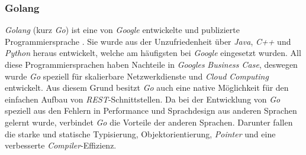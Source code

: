 		\subsubsection{Golang}
		\label{chapter:golanganalyse}
		\textit{Golang} (kurz \textit{Go}) ist eine von \textit{Google} entwickelte und publizierte Programmiersprache \cite{goDocs}. Sie wurde aus der Unzufriedenheit über \textit{Java}, \textit{C++} und \textit{Python} heraus entwickelt, welche am häufigsten bei \textit{Google} eingesetzt wurden. All diese Programmiersprachen haben Nachteile in \textit{Googles} \textit{Business Case}, deswegen wurde \textit{Go} speziell für skalierbare Netzwerkdienste und \textit{Cloud Computing} entwickelt. Aus diesem Grund besitzt \textit{Go} auch eine native Möglichkeit für den einfachen Aufbau von \textit{REST}-Schnittstellen. Da bei der Entwicklung von \textit{Go} speziell aus den Fehlern in Performance und Sprachdesign aus anderen Sprachen gelernt wurde, verbindet \textit{Go} die Vorteile der anderen Sprachen. Darunter fallen die starke und statische Typisierung, Objektorientierung, \textit{Pointer} und eine verbesserte \textit{Compiler}-Effizienz.
		\newpage
